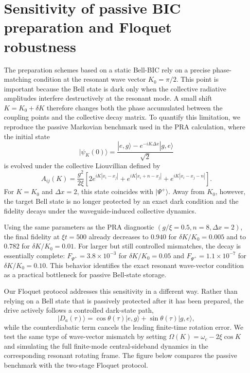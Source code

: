 \section{Sensitivity of passive BIC preparation and Floquet robustness}
\label{sec:k_sensitivity}

The preparation schemes based on a static Bell-BIC rely on a precise
phase-matching condition at the resonant wave vector \(K_0=\pi/2\). This
point is important because the Bell state is dark only when the collective
radiative amplitudes interfere destructively at the resonant mode. A small
shift \(K=K_0+\delta K\) therefore changes both the phase accumulated between
the coupling points and the collective decay matrix. To quantify this
limitation, we reproduce the passive Markovian benchmark used in the PRA
calculation, where the initial state
\begin{equation}
|\psi_K(0)\rangle =
\frac{|e,g\rangle-e^{-iK\Delta x}|g,e\rangle}{\sqrt{2}}
\end{equation}
is evolved under the collective Liouvillian defined by
\begin{equation}
A_{ij}(K)=
\frac{g^2}{2\xi}
\left[
2e^{iK|x_i-x_j|}
+e^{iK|x_i+n-x_j|}
+e^{iK|x_i-x_j-n|}
\right].
\label{eq:pra_collective_matrix}
\end{equation}
For \(K=K_0\) and \(\Delta x=2\), this state coincides with
\(|\Psi^+\rangle\). Away from \(K_0\), however, the target Bell state is no
longer protected by an exact dark condition and the fidelity decays under the
waveguide-induced collective dynamics.

Using the same parameters as the PRA diagnostic
\((g/\xi=0.5,n=8,\Delta x=2)\), the final fidelity at \(\xi t=500\)
already decreases to \(0.940\) for \(\delta K/K_0=0.005\) and to
\(0.782\) for \(\delta K/K_0=0.01\). For larger but still controlled
mismatches, the decay is essentially complete: \(F_{\Psi^+}=3.8\times10^{-3}\)
for \(\delta K/K_0=0.05\) and \(F_{\Psi^+}=1.1\times10^{-7}\) for
\(\delta K/K_0=0.10\). This behavior identifies the exact resonant
wave-vector condition as a practical bottleneck for passive Bell-state
storage.

Our Floquet protocol addresses this sensitivity in a different way. Rather
than relying on a Bell state that is passively protected after it has been
prepared, the drive actively follows a controlled dark-state path,
\begin{equation}
|D_a(\tau)\rangle =
\cos\theta(\tau)|e,g\rangle+\sin\theta(\tau)|g,e\rangle ,
\end{equation}
while the counterdiabatic term cancels the leading finite-time rotation
error. We test the same type of wave-vector mismatch by setting
\(\Omega(K)=\omega_c-2\xi\cos K\) and simulating the full finite-mode
central-sideband dynamics in the corresponding resonant rotating frame. The
figure below compares the passive benchmark with the two-stage Floquet
protocol.

